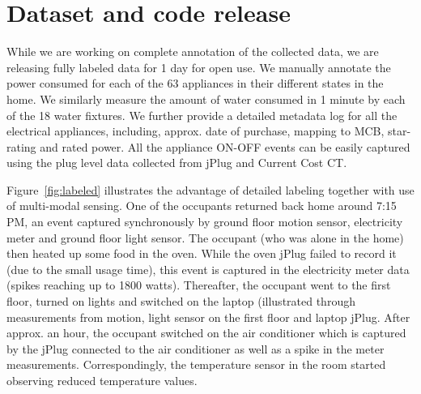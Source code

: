 \documentclass[10pt]{sensys-proc}
\newcommand{\figref}[1]{Figure~\ref{#1}}
\begin{document}
\vspace{-1mm}
\section{Dataset and code release}
While we are working on complete annotation of the collected data, we are releasing fully labeled data for 1 day for open use. %
We manually annotate the power consumed for each of the 63 appliances in their different states in the home. We similarly measure the amount of water consumed in 1 minute by each of the 18 water fixtures. We further provide a detailed metadata log for all the electrical appliances, including, approx. date of purchase, mapping to MCB, star-rating and rated power. All the appliance ON-OFF events can be easily captured using the plug level data collected from jPlug and Current Cost CT. 

\figref{fig:labeled} illustrates the advantage of detailed labeling together with use of multi-modal sensing. One of the occupants returned back home around 7:15 PM, an event captured synchronously by ground floor motion sensor, electricity meter and ground floor light sensor. The occupant (who was alone in the home) then heated up some food in the oven. While the oven jPlug failed to record it (due to the small usage time), this event is captured in the electricity meter data (spikes reaching up to 1800 watts). Thereafter, the occupant went to the first floor, turned on lights and switched on the laptop (illustrated through measurements from motion, light sensor on the first floor and laptop jPlug. After approx. an hour, the occupant switched on the air conditioner which is captured by the jPlug connected to the air conditioner as well as a spike in the meter measurements. Correspondingly, the temperature sensor in the room started observing reduced temperature values. 
 
\end{document}
